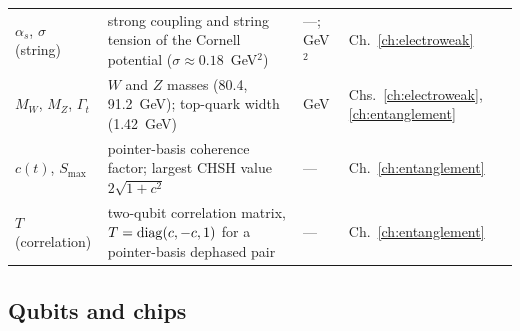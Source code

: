 {\begin{longtable}{@{}>{\raggedright\arraybackslash}p{}>{\raggedright\arraybackslash}p{}>{\raggedright\arraybackslash}p{}>{\raggedright\arraybackslash}p{}@{}}
$\alpha_s$, $\sigma$ (string) & strong coupling and string tension of the Cornell potential ($\sigma\approx0.18$~GeV$^2$) & ---; GeV$^2$ & Ch.~\ref{ch:electroweak}\\\iamrowrule
$M_W$, $M_Z$, $\Gamma_t$ & $W$ and $Z$ masses (80.4, 91.2~GeV); top-quark width (1.42~GeV) & GeV & Chs.~\ref{ch:electroweak}, \ref{ch:entanglement}\\\iamrowrule
$c(t)$, $S_{\max}$ & pointer-basis coherence factor; largest CHSH value $2\sqrt{1+c^2}$ & --- & Ch.~\ref{ch:entanglement}\\\iamrowrule
$T$ (correlation) & two-qubit correlation matrix, $T={\rm diag}(c,-c,1)$ for a pointer-basis dephased pair & --- & Ch.~\ref{ch:entanglement}\\
\bottomrule\end{longtable}}
\subsection*{Qubits and chips}
